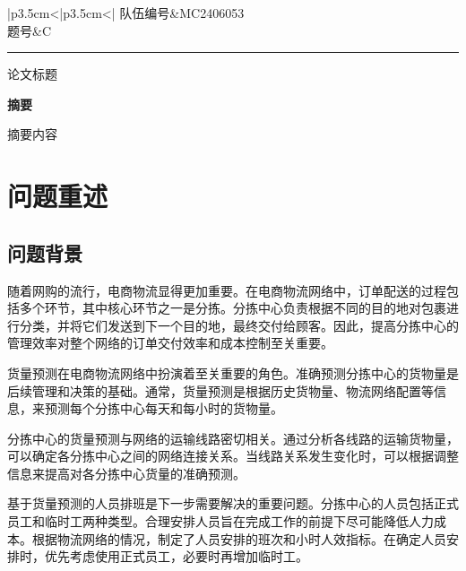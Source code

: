 \documentclass[UTF8,a4paper,10 pt]{article}%
\begin{document}
	\setlength{\lineskip}{8pt}
	\setlength{\lineskiplimit}{8pt}
    
\begin{table}[!ht]
    \renewcommand\arraystretch{1.5}
    \centering  
    \begin{tabular}{|p{3.5cm}<{\centering}|p{3.5cm}<{\centering}|}
        \hline
        {队伍编号}&MC2406053\\
        \hline
        题号&C\\
        \hline        
    \end{tabular}
\end{table}

\setcounter{page}{1}

\noindent\rule{\linewidth}{1pt}
\begin{center}
    \Large 论文标题
\end{center}
\begin{center}
    \large\bf 摘要
\end{center}

摘要内容



\newpage

\tableofcontents


\newpage
\setcounter{page}{1}


\section{问题重述}
\subsection{问题背景}
随着网购的流行，电商物流显得更加重要。在电商物流网络中，订单配送的过程包括多个环节，其中核心环节之一是分拣。分拣中心负责根据不同的目的地对包裹进行分类，并将它们发送到下一个目的地，最终交付给顾客。因此，提高分拣中心的管理效率对整个网络的订单交付效率和成本控制至关重要。

货量预测在电商物流网络中扮演着至关重要的角色。准确预测分拣中心的货物量是后续管理和决策的基础。通常，货量预测是根据历史货物量、物流网络配置等信息，来预测每个分拣中心每天和每小时的货物量。

分拣中心的货量预测与网络的运输线路密切相关。通过分析各线路的运输货物量，可以确定各分拣中心之间的网络连接关系。当线路关系发生变化时，可以根据调整信息来提高对各分拣中心货量的准确预测。

基于货量预测的人员排班是下一步需要解决的重要问题。分拣中心的人员包括正式员工和临时工两种类型。合理安排人员旨在完成工作的前提下尽可能降低人力成本。根据物流网络的情况，制定了人员安排的班次和小时人效指标。在确定人员安排时，优先考虑使用正式员工，必要时再增加临时工。
\end{document}
